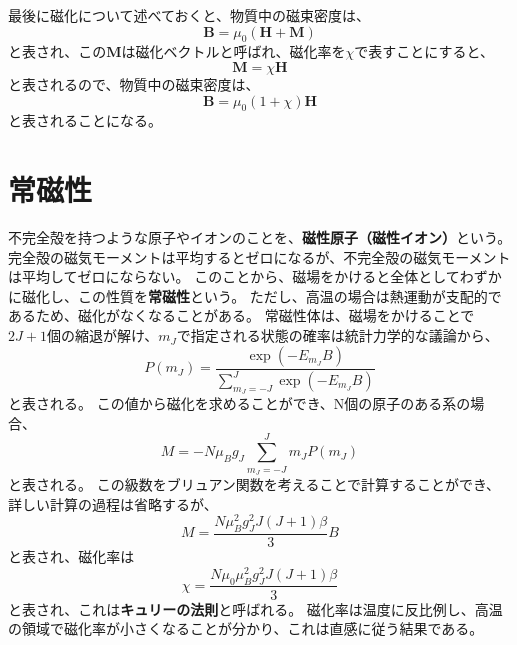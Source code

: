 \documentclass[a4paper]{jsreport}
\begin{document}
            最後に磁化について述べておくと、物質中の磁束密度は、
            \begin{equation}
                \boldsymbol{B} = \mu_0 (\boldsymbol{H} + \boldsymbol{M})
            \end{equation}
            と表され、この$\boldsymbol{M}$は磁化ベクトルと呼ばれ、磁化率を$\chi$で表すことにすると、
            \begin{equation}
                \boldsymbol{M} = \chi \boldsymbol{H}
            \end{equation}
            と表されるので、物質中の磁束密度は、
            \begin{equation}
                \boldsymbol{B} = \mu_0 (1 + \chi) \boldsymbol{H}
            \end{equation}
            と表されることになる。

        \section{常磁性}
            不完全殻を持つような原子やイオンのことを、\textbf{磁性原子（磁性イオン）}という。
            完全殻の磁気モーメントは平均するとゼロになるが、不完全殻の磁気モーメントは平均してゼロにならない。
            このことから、磁場をかけると全体としてわずかに磁化し、この性質を\textbf{常磁性}という。
            ただし、高温の場合は熱運動が支配的であるため、磁化がなくなることがある。
            常磁性体は、磁場をかけることで$2J+1$個の縮退が解け、$m_J$で指定される状態の確率は統計力学的な議論から、
            \begin{equation}
                P(m_J) = \frac{\exp(- E_{m_J} B)}{\sum\limits_{m_J=-J}^{J} \exp(- E_{m_J} B)}
            \end{equation}
            と表される。
            この値から磁化を求めることができ、N個の原子のある系の場合、
            \begin{equation}
                M = - N \mu_B g_J \sum\limits_{m_J=-J}^{J} m_J P(m_J)
            \end{equation}
            と表される。
            この級数をブリュアン関数を考えることで計算することができ、詳しい計算の過程は省略するが、
            \begin{equation}
                M = \frac{N \mu_B^2 g_J^2 J(J+1) \beta}{3} B
            \end{equation}
            と表され、磁化率は
            \begin{equation}
                \chi = \frac{N \mu_0 \mu_B^2 g_J^2 J(J+1) \beta}{3}
            \end{equation}
            と表され、これは\textbf{キュリーの法則}と呼ばれる。
            磁化率は温度に反比例し、高温の領域で磁化率が小さくなることが分かり、これは直感に従う結果である。
\end{document}
